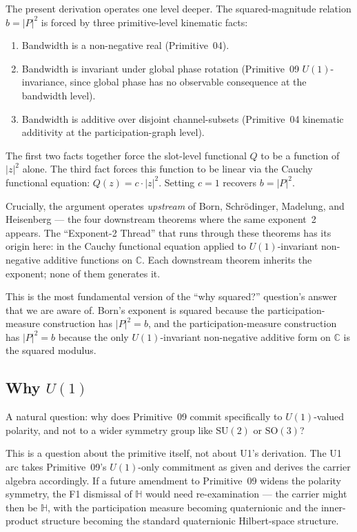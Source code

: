\documentclass[11pt,a4paper]{article}
\begin{document}
The present derivation operates one level deeper. The squared-magnitude relation $b = |P|^2$ is forced by three primitive-level kinematic facts:
\begin{enumerate}
  \item Bandwidth is a non-negative real (Primitive~04).
  \item Bandwidth is invariant under global phase rotation (Primitive~09 $U(1)$-invariance, since global phase has no observable consequence at the bandwidth level).
  \item Bandwidth is additive over disjoint channel-subsets (Primitive~04 kinematic additivity at the participation-graph level).
\end{enumerate}
The first two facts together force the slot-level functional $Q$ to be a function of $|z|^2$ alone. The third fact forces this function to be linear via the Cauchy functional equation: $Q(z) = c \cdot |z|^2$. Setting $c = 1$ recovers $b = |P|^2$.

Crucially, the argument operates \emph{upstream} of Born, Schr\"odinger, Madelung, and Heisenberg --- the four downstream theorems where the same exponent~2 appears. The ``Exponent-2 Thread'' that runs through these theorems has its origin here: in the Cauchy functional equation applied to $U(1)$-invariant non-negative additive functions on $\mathbb{C}$. Each downstream theorem inherits the exponent; none of them generates it.

This is the most fundamental version of the ``why squared?'' question's answer that we are aware of. Born's exponent is squared because the participation-measure construction has $|P|^2 = b$, and the participation-measure construction has $|P|^2 = b$ because the only $U(1)$-invariant non-negative additive form on $\mathbb{C}$ is the squared modulus.

\subsection{Why $U(1)$}

A natural question: why does Primitive~09 commit specifically to $U(1)$-valued polarity, and not to a wider symmetry group like $\mathrm{SU}(2)$ or $\mathrm{SO}(3)$?

This is a question about the primitive itself, not about U1's derivation. The U1 arc takes Primitive~09's $U(1)$-only commitment as given and derives the carrier algebra accordingly. If a future amendment to Primitive~09 widens the polarity symmetry, the F1 dismissal of $\mathbb{H}$ would need re-examination --- the carrier might then be $\mathbb{H}$, with the participation measure becoming quaternionic and the inner-product structure becoming the standard quaternionic Hilbert-space structure.
\end{document}
